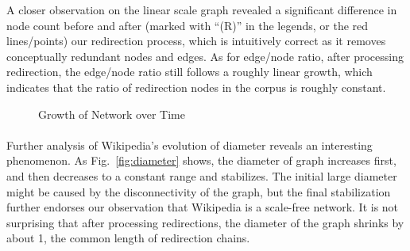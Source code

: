 \documentclass[10pt]{article}
\begin{document}
\begin{multicols}{2}
A closer observation on the linear scale graph revealed a significant difference in node count before and after (marked with ``(R)'' in the legends, or the red lines/points) our redirection process, which is intuitively correct as it removes conceptually redundant nodes and edges. As for edge/node ratio, after processing redirection, the edge/node ratio still follows a roughly linear growth, which indicates that the ratio of redirection nodes in the corpus is roughly constant.

\begin{figure}
\caption{Growth of Network over Time \label{fig:growth}}
\end{figure}

\paragraph{}Further analysis of Wikipedia's evolution of diameter reveals an interesting phenomenon. As Fig.~\ref{fig:diameter} shows, the diameter of graph increases first, and then decreases to a constant range and stabilizes. The initial large diameter might be caused by the disconnectivity of the graph, but the final stabilization further endorses our observation that Wikipedia is a scale-free network. It is not surprising that after processing redirections, the diameter of the graph shrinks by about 1, the common length of redirection chains.


\end{multicols}
\end{document}
